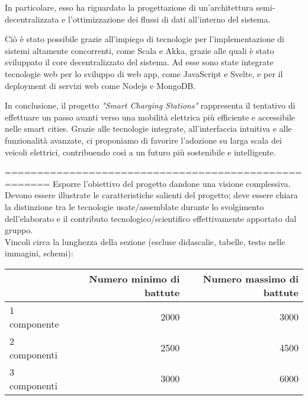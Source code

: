 In particolare, esso ha riguardato la progettazione di un'architettura semi-decentralizzata e l'ottimizzazione dei flussi di dati all'interno
del sistema.

Ciò è stato possibile grazie all'impiego di tecnologie per l'implementazione di sistemi altamente concorrenti, come Scala e Akka, grazie alle quali è stato sviluppato il core decentralizzato del sistema.
Ad esse sono state integrate tecnologie web per lo sviluppo di web app, come JavaScript e Svelte, e per il deployment di servizi web come Nodejs e MongoDB.

In conclusione, il progetto \textit{"Smart Charging Stations"} rappresenta il tentativo di effettuare un passo avanti verso una mobilità elettrica più efficiente e accessibile nelle smart cities.
Grazie alle tecnologie integrate, all'interfaccia intuitiva e alle funzionalità avanzate, ci proponiamo di favorire l'adozione su larga scala dei veicoli elettrici, contribuendo
così a un futuro più sostenibile e intelligente.


=====================================================
Esporre l’obiettivo del progetto dandone una visione complessiva.\\

Devono essere illustrate le caratteristiche salienti del progetto; deve essere chiara la distinzione tra le tecnologie usate/assemblate durante lo svolgimento dell'elaborato e il contributo tecnologico/scientifico effettivamente apportato dal gruppo.\\


Vincoli circa la lunghezza della sezione (escluse didascalie, tabelle, testo nelle immagini, schemi):

\vspace{1cm}
\begin{tabular}{l|rr}
                 & Numero minimo di battute & Numero massimo di battute \\
    \hline
    1 componente & 2000                     & 3000                      \\
    2 componenti & 2500                     & 4500                      \\
    3 componenti & 3000                     & 6000                      \\
    \hline
\end{tabular}


\newpage
